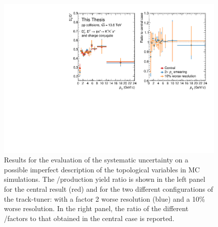 \begin{figure}[htb]
    \begin{center}
    \includegraphics[width=\textwidth]{Figures/Chapter 6/TrackTunerSyst.pdf}
    \caption{Results for the evaluation of the systematic uncertainty on a possible imperfect description of the topological variables in MC simulations. The \ds/\dpl production yield ratio is shown in the left panel for the central result (red) and for the two different configurations of the track-tuner: with a factor 2 worse \pt resolution (blue) and a 10\% worse resolution. In the right panel, the ratio of the different \ds/\dpl factors to that obtained in the central case is reported.} 
    \label{fig:tracktuner} 
    \end{center}
\end{figure}

